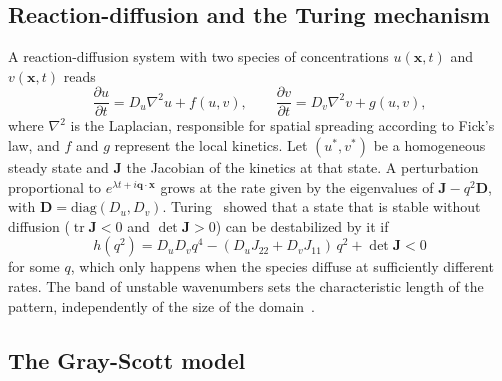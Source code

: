 \documentclass[final,5p,times,twocolumn]{elsarticle}
\begin{document}
\subsection{Reaction-diffusion and the Turing mechanism}\label{subsec:turing}

A reaction-diffusion system with two species of concentrations $u(\mathbf{x},t)$ and $v(\mathbf{x},t)$ reads
\begin{equation}\label{eq:rd}
\frac{\partial u}{\partial t} = D_u \nabla^2 u + f(u,v), \qquad
\frac{\partial v}{\partial t} = D_v \nabla^2 v + g(u,v),
\end{equation}
where $\nabla^2$ is the Laplacian, responsible for spatial spreading according to Fick's law, and $f$ and $g$ represent the local kinetics. Let $(u^*,v^*)$ be a homogeneous steady state and $\mathbf{J}$ the Jacobian of the kinetics at that state. A perturbation proportional to $e^{\lambda t+i\mathbf{q}\cdot\mathbf{x}}$ grows at the rate given by the eigenvalues of $\mathbf{J}-q^2\mathbf{D}$, with $\mathbf{D}=\mathrm{diag}(D_u,D_v)$. Turing~\cite{turing1952} showed that a state that is stable without diffusion ($\operatorname{tr}\mathbf{J}<0$ and $\det\mathbf{J}>0$) can be destabilized by it if
\begin{equation}\label{eq:turing}
h(q^2)=D_uD_v q^4-(D_u J_{22} + D_v J_{11})\,q^2+\det\mathbf{J} < 0
\end{equation}
for some $q$, which only happens when the species diffuse at sufficiently different rates. The band of unstable wavenumbers sets the characteristic length of the pattern, independently of the size of the domain~\cite{murray2003}.

\subsection{The Gray-Scott model}\label{subsec:gsmodel}
\end{document}
